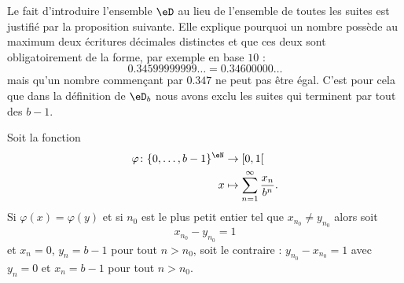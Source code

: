 Le fait d'introduire l'ensemble \( \eD\) au lieu de l'ensemble de toutes les suites est justifié par la proposition suivante. Elle explique pourquoi un nombre possède au maximum deux écritures décimales distinctes et que ces deux sont obligatoirement de la forme, par exemple en base \( 10\) :
\begin{equation}
    0.34599999999\ldots=0.34600000\ldots
\end{equation}
mais qu'un nombre commençant par \( 0.347\) ne peut pas être égal. C'est pour cela que dans la définition de \( \eD_b\) nous avons exclu les suites qui terminent par tout des \( b-1\).
\begin{proposition} \label{PropSAOoofRlQR}
    Soit la fonction
    \begin{equation}
        \begin{aligned}
            \varphi\colon \{ 0,\ldots, b-1 \}^{\eN}&\to \mathopen[ 0 , 1 [ \\
                x&\mapsto \sum_{n=1}^{\infty}\frac{ x_n }{ b^n }.
        \end{aligned}
    \end{equation}
    Si \( \varphi(x)=\varphi(y)\) et si \( n_0\) est le plus petit entier tel que \( x_{n_0}\neq y_{n_0}\) alors soit
    \begin{equation}
        x_{n_0}-y_{n_0}=1
    \end{equation}
    et \( x_n=0\), \( y_n=b-1\) pour tout \( n>n_0\), soit le contraire : \( y_{n_0}-x_{n_0}=1\) avec \( y_n=0\) et \( x_n=b-1\) pour tout \( n>n_0\).
\end{proposition}

